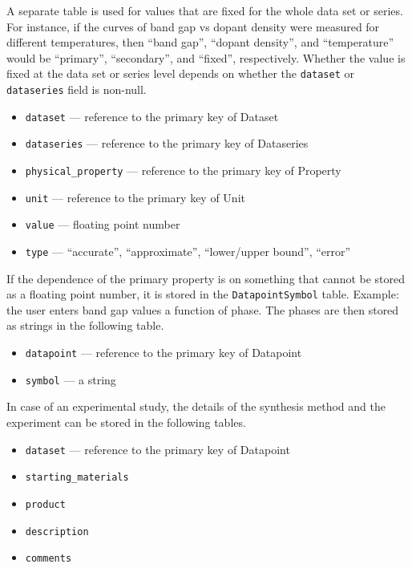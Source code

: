 \documentclass{article}
\begin{document}
A separate table is used for values that are fixed for the whole data set or series. For instance, if the curves of band gap vs dopant density were measured for different temperatures, then ``band gap'', ``dopant density'', and ``temperature'' would be ``primary'', ``secondary'', and ``fixed'', respectively. Whether the value is fixed at the data set or series level depends on whether the \texttt{dataset} or \texttt{dataseries} field is non-null.
\begin{tcolorbox}[colback=green!5,colframe=green!40!black,title=NumericalValueFixed(Base)]
  \begin{itemize}
  \item \texttt{dataset} --- reference to the primary key of Dataset
  \item \texttt{dataseries} --- reference to the primary key of Dataseries
  \item \texttt{physical\_property} --- reference to the primary key of Property
  \item \texttt{unit} --- reference to the primary key of Unit
  \item \texttt{value} --- floating point number
  \item \texttt{type} --- ``accurate'', ``approximate'', ``lower/upper bound'', ``error''
  \end{itemize}
\end{tcolorbox}

If the dependence of the primary property is on something that cannot be stored as a floating point number, it is stored in the \texttt{DatapointSymbol} table. Example: the user enters band gap values a function of phase. The phases are then stored as strings in the following table.
\begin{tcolorbox}[colback=green!5,colframe=green!40!black,title=DatapointSymbol(Base)]
  \begin{itemize}
  \item \texttt{datapoint} --- reference to the primary key of Datapoint
  \item \texttt{symbol} --- a string
  \end{itemize}
\end{tcolorbox}

In case of an experimental study, the details of the synthesis method and the experiment can be stored in the following tables.
\begin{tcolorbox}[colback=green!5,colframe=green!40!black,title=SynthesisMethod(Base)]
  \begin{itemize}
  \item \texttt{dataset} --- reference to the primary key of Datapoint
  \item \texttt{starting\_materials}
  \item \texttt{product}
  \item \texttt{description}
  \item \texttt{comments}
  \end{itemize}
\end{tcolorbox}
\end{document}
